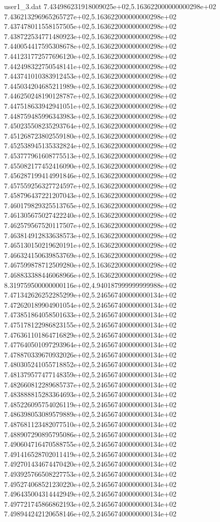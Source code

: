 \begin{filecontents}{user1_3.dat}
7.434986231918009025e+02,5.163622000000000298e+02
7.436213296965265727e+02,5.163622000000000298e+02
7.437478011558157505e+02,5.163622000000000298e+02
7.438722534771480923e+02,5.163622000000000298e+02
7.440054417595308678e+02,5.163622000000000298e+02
7.441231772577696120e+02,5.163622000000000298e+02
7.442498322750548141e+02,5.163622000000000298e+02
7.443741010383912453e+02,5.163622000000000298e+02
7.445034204685211989e+02,5.163622000000000298e+02
7.446250248190128787e+02,5.163622000000000298e+02
7.447518633942941051e+02,5.163622000000000298e+02
7.448759485996343983e+02,5.163622000000000298e+02
7.450235508235293764e+02,5.163622000000000298e+02
7.451268723802559180e+02,5.163622000000000298e+02
7.452538945135332824e+02,5.163622000000000298e+02
7.453777961608775513e+02,5.163622000000000298e+02
7.455082177452416090e+02,5.163622000000000298e+02
7.456287199414991846e+02,5.163622000000000298e+02
7.457559256327724597e+02,5.163622000000000298e+02
7.458796437221207043e+02,5.163622000000000298e+02
7.460179829325513765e+02,5.163622000000000298e+02
7.461305675027422240e+02,5.163622000000000298e+02
7.462579567520117507e+02,5.163622000000000298e+02
7.463814912833638573e+02,5.163622000000000298e+02
7.465130150219620191e+02,5.163622000000000298e+02
7.466324150639853769e+02,5.163622000000000298e+02
7.467599878712509280e+02,5.163622000000000298e+02
7.468833388446068966e+02,5.163622000000000298e+02
8.319759500000000116e+02,4.940187999999999988e+02
7.471342626252285299e+02,5.246567400000000134e+02
7.472620189904901054e+02,5.246567400000000134e+02
7.473851864058501633e+02,5.246567400000000134e+02
7.475178122986823155e+02,5.246567400000000134e+02
7.476361101864716829e+02,5.246567400000000134e+02
7.477640501097293964e+02,5.246567400000000134e+02
7.478870339670932026e+02,5.246567400000000134e+02
7.480305241055718852e+02,5.246567400000000134e+02
7.481379577477148359e+02,5.246567400000000134e+02
7.482660812289685737e+02,5.246567400000000134e+02
7.483888815283364693e+02,5.246567400000000134e+02
7.485226095754026119e+02,5.246567400000000134e+02
7.486398053089579889e+02,5.246567400000000134e+02
7.487681123482077510e+02,5.246567400000000134e+02
7.488907290895795086e+02,5.246567400000000134e+02
7.490604716470588755e+02,5.246567400000000134e+02
7.491416528702011419e+02,5.246567400000000134e+02
7.492701434674470420e+02,5.246567400000000134e+02
7.493925766508227753e+02,5.246567400000000134e+02
7.495274068521230220e+02,5.246567400000000134e+02
7.496435004314442949e+02,5.246567400000000134e+02
7.497721745866862193e+02,5.246567400000000134e+02
7.498944242120658146e+02,5.246567400000000134e+02

\end{filecontents}
